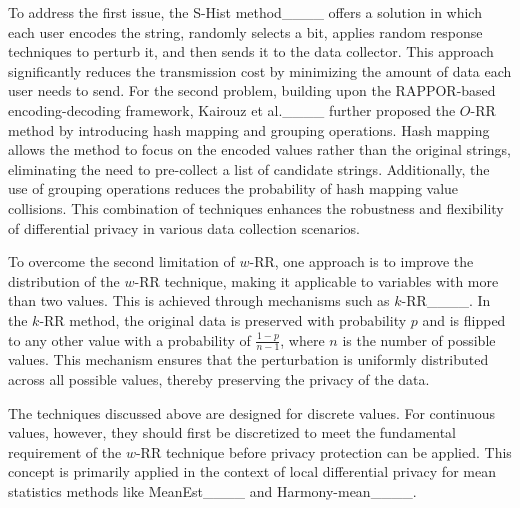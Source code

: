 To address the first issue, the S-Hist method____ offers a solution in which each user encodes the string, randomly selects a bit, applies random response techniques to perturb it, and then sends it to the data collector. This approach significantly reduces the transmission cost by minimizing the amount of data each user needs to send. 
For the second problem, building upon the RAPPOR-based encoding-decoding framework, Kairouz et al.____ further proposed the $O$-RR method by introducing hash mapping and grouping operations. Hash mapping allows the method to focus on the encoded values rather than the original strings, eliminating the need to pre-collect a list of candidate strings. Additionally, the use of grouping operations reduces the probability of hash mapping value collisions. This combination of techniques enhances the robustness and flexibility of differential privacy in various data collection scenarios.%

To overcome the second limitation of $w$-RR, one approach is to improve the distribution of the $w$-RR technique, making it applicable to variables with more than two values. This is achieved through mechanisms such as $k$-RR____. In the $k$-RR method, the original data is preserved with probability $p$ and is flipped to any other value with a probability of $\frac{1-p}{n-1}$,  where $n$ is the number of possible values. This mechanism ensures that the perturbation is uniformly distributed across all possible values, thereby preserving the privacy of the data. 

The techniques discussed above are designed for discrete values. For continuous values, however, they should first be discretized to meet the fundamental requirement of the $w$-RR technique before privacy protection can be applied. This concept is primarily applied in the context of local differential privacy for mean statistics methods like MeanEst____ and Harmony-mean____.

